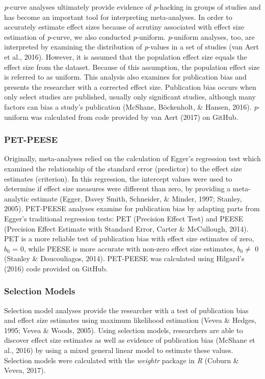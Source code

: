 \documentclass[,man]{apa6}
\begin{document}
\emph{p}-curve analyses ultimately provide evidence of \emph{p}-hacking in groups of studies and has become an important tool for interpreting meta-analyses. In order to accurately estimate effect sizes because of scrutiny associated with effect size estimation of \emph{p}-curve, we also conducted \emph{p}-uniform. \emph{p}-uniform analyses, too, are interpreted by examining the distribution of \emph{p}-values in a set of studies (van Aert et al., 2016). However, it is assumed that the population effect size equals the effect size from the dataset. Because of this assumption, the population effect size is referred to as uniform. This analysis also examines for publication bias and presents the researcher with a corrected effect size. Publication bias occurs when only select studies are published, usually only significant studies, although many factors can bias a study's publication (McShane, Böckenholt, \& Hansen, 2016). \emph{p}-uniform was calculated from code provided by van Aert (2017) on GitHub.

\hypertarget{pet-peese}{%
\subsubsection{PET-PEESE}\label{pet-peese}}

Originally, meta-analyses relied on the calculation of Egger's regression test which examined the relationship of the standard error (predictor) to the effect size estimates (criterion). In this regression, the intercept values were used to determine if effect size measures were different than zero, by providing a meta-analytic estimate (Egger, Davey Smith, Schneider, \& Minder, 1997; Stanley, 2005). PET-PEESE analyses examine for publication bias by adapting parts from Egger's traditional regression tests: PET (Precision Effect Test) and PEESE (Precision Effect Estimate with Standard Error, Carter \& McCullough, 2014). PET is a more reliable test of publication bias with effect size estimates of zero, \(b_0\) = 0, while PEESE is more accurate with non-zero effect size estimates, \(b_0 \neq\) 0 (Stanley \& Doucouliagos, 2014). PET-PEESE was calculated using Hilgard's (2016) code provided on GitHub.

\hypertarget{selection-models}{%
\subsubsection{Selection Models}\label{selection-models}}

Selection model analyses provide the researcher with a test of publication bias and effect size estimates using maximum likelihood estimation (Vevea \& Hedges, 1995; Vevea \& Woods, 2005). Using selection models, researchers are able to discover effect size estimates as well as evidence of publication bias (McShane et al., 2016) by using a mixed general linear model to estimate these values. Selection models were calculated with the \emph{weightr} package in \emph{R} (Coburn \& Vevea, 2017).
\end{document}
